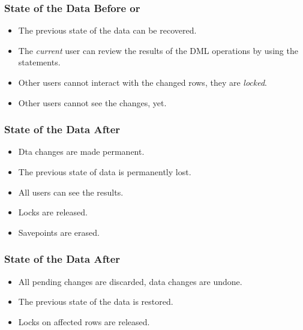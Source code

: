 \documentclass[11pt,a4paper,twocolumn]{book}
\begin{document}
\subsubsection{State of the Data Before  or }

\begin{itemize}
\item The previous state of the data can be recovered.
\item The \textit{current} user can review the results of the DML operations by using the  statements.
\item Other users cannot interact with the changed rows, they are \textit{locked}.
\item Other users cannot see the changes, yet.
\end{itemize}

\subsubsection{State of the Data After }

\begin{itemize}
\item Dta changes are made permanent.
\item The previous state of data is permanently lost.
\item All users can see the results.
\item Locks are released.
\item Savepoints are erased.
\end{itemize}

\subsubsection{State of the Data After }

\begin{itemize}
\item All pending changes are discarded, data changes are undone.
\item The previous state of the data is restored.
\item Locks on affected rows are released.
\end{itemize}
\end{document}
